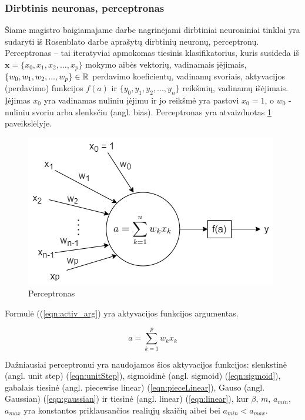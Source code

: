 \subsubsection{Dirbtinis neuronas, perceptronas}

Šiame magistro baigiamajame darbe nagrinėjami dirbtiniai neuroniniai tinklai yra sudaryti iš Rosenblato darbe \cite{rosenPerc} aprašytų dirbtinių neuronų, perceptronų. Perceptronas --  tai iteratyviai apmokomas tiesinis klasifikatorius, kuris susideda iš $\boldsymbol{x} = \{x_{0}, x_{1}, x_{2}, ..., x_{p}\}$ mokymo aibės vektorių, vadinamais įėjimais, $\{w_{0}, w_{1}, w_{2}, ..., w_{p}\} \in \mathbb{R}$ perdavimo koeficientų, vadinamų svoriais, aktyvacijos (perdavimo) funkcijos $f(a)$ ir $\{y_{0}, y_{1}, y_{2}, ..., y_{n}\}$ reikšmių, vadinamų išėjimais. Įėjimas $x_{0}$ yra vadinamas nuliniu įėjimu ir jo reikšmė yra pastovi $x_{0} = 1$, o $w_{0}$ - nuliniu svoriu arba slenksčiu (angl. bias). Perceptronas yra atvaizduotas \ref{img:perceptron} paveikslėlyje.

\begin{figure}[H]
	\centering
	\includegraphics[scale=0.5]{img/perceptron.png}
	\caption{Perceptronas}
	\label{img:perceptron}
\end{figure}

Formulė ((\ref{eqn:activ_arg}) yra aktyvacijos funkcijos argumentas.

\begin{equation}
	\label{eqn:activ_arg}
	a = \sum_{k = 1}^{p} w_{k}x_k
\end{equation}

Dažniausiai perceptronui yra naudojamos šios aktyvacijos funkcijos: slenkstinė (angl. unit step) (\ref{eqn:unitStep}), sigmoidinė (angl. sigmoid) (\ref{eqn:sigmoid}), gabalais tiesinė (angl. piecewise linear) (\ref{eqn:pieceLinear}), Gauso (angl. Gaussian) (\ref{eqn:gaussian}) ir tiesinė (angl. linear) (\ref{eqn:linear}), kur $\beta$, $m$, $a_{min}$, $a_{max}$ yra konstantos priklausančios realiųjų skaičių aibei bei $a_{min} < a_{max}$.

